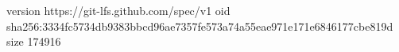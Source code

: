 version https://git-lfs.github.com/spec/v1
oid sha256:3334fc5734db9383bbcd96ae7357fe573a74a55eae971e171e6846177cbe819d
size 174916
